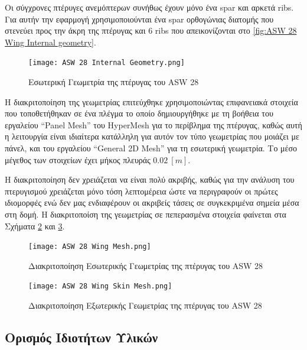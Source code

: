 Οι σύγχρονες πτέρυγες ανεμόπτερων συνήθως έχουν μόνο ένα \textlatin{spar} και αρκετά \textlatin{ribs}. Για αυτήν την εφαρμογή χρησιμοποιούνται ένα \textlatin{spar} ορθογώνιας διατομής που στενεύει προς την άκρη της πτέρυγας και 6 \textlatin{ribs} που απεικονίζονται στο \autoref{fig:ASW 28 Wing Internal geometry}.

\begin{figure}[H]
    \centering
    \texttt{[image: ASW 28 Internal Geometry.png]}
    \caption{Εσωτερική Γεωμετρία της πτέρυγας του \textlatin{ASW 28}}
    \label{fig:ASW 28 Wing Internal geometry}
\end{figure}


Η διακριτοποίηση της γεωμετρίας επιτεύχθηκε χρησιμοποιώντας επιφανειακά στοιχεία που τοποθετήθηκαν σε ένα πλέγμα το οποίο δημιουργήθηκε με τη βοήθεια του εργαλείου \textlatin{``Panel Mesh''} του \textlatin{HyperMesh} για το περίβλημα της πτέρυγας, καθώς αυτή η λειτουργία είναι ιδιαίτερα κατάλληλη για αυτόν τον τύπο γεωμετρίας που μοιάζει με πάνελ, και του εργαλείου \textlatin{``General 2D Mesh''} για τη εσωτερική γεωμετρία. Το μέσο μέγεθος των στοιχείων έχει μήκος πλευράς \(0.02\ [m]\).

Η διακριτοποίηση δεν χρειάζεται να είναι πολύ ακριβής, καθώς για την ανάλυση του πτερυγισμού χρειάζεται μόνο τόση λεπτομέρεια ώστε να περιγραφούν οι πρώτες ιδιομορφές ενώ δεν μας ενδιαφέρουν οι ακριβείς τάσεις σε συγκεκριμένα σημεία μέσα στη δομή. Η διακριτοποίση της γεωμετρίας σε πεπερασμένα στοιχεία φαίνεται στα Σχήματα \ref{fig:ASW 28 Wing Internal mesh} και \ref{fig:ASW 28 Wing skin mesh}.


\begin{figure}[H]
\centering
\texttt{[image: ASW 28 Wing Mesh.png]}
\caption{Διακριτοποίηση Εσωτερικής Γεωμετρίας της πτέρυγας του \textlatin{ASW 28}}
\label{fig:ASW 28 Wing Internal mesh}

\end{figure}

\begin{figure}[H]
\centering
\texttt{[image: ASW 28 Wing Skin Mesh.png]}
\caption{Διακριτοποίηση Εξωτερικής Γεωμετρίας της πτέρυγας του \textlatin{ASW 28}}
\label{fig:ASW 28 Wing skin mesh}
\end{figure}

\subsection{Ορισμός Ιδιοτήτων Υλικών}
\label{material-properties-definition.}

